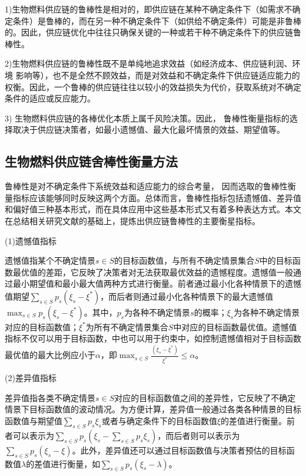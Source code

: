 1)生物燃料供应链的鲁棒性是相对的，即供应链在某种不确定条件下（如需求不确定条件）是鲁棒的，而在另一种不确定条件下（如供给不确定条件）可能是非鲁棒的。因此，供应链优化中往往只确保关键的一种或若干种不确定条件下的供应链鲁棒性。

2)生物燃料供应链的鲁棒性既不是单纯地追求效益（如经济成本、供应链利润、环境 影响等），也不是全然不顾效益，而是对效益和不确定条件下供应链适应能力的权衡。因此，一个鲁棒的供应链往往以较小的效益损失为代价，获取系统对不确定条件的适应或反应能力。

3)	生物燃料供应链的各棒优化本质上属千风险决策。因此， 鲁棒性衡量指标的选择取决于供应链决策者，如最小遗憾值、最大化最坏情景的效益、期望值等。

\subsection{生物燃料供应链舍棒性衡量方法}
鲁棒性是对不确定条件下系统效益和适应能力的综合考量， 因而选取的鲁棒性衡量指标应该能够同时反映这两个方面。总体而言，鲁棒性指标包括遗憾值、差异值和偏好值三种基本形式，而在具体应用中这些基本形式又有着多种表达方式。本文在总结相关研究文献的基础上，提炼出供应链鲁棒性的主要衡星指标。

(1)遗憾值指标

遗憾值指某个不确定情景$s\in S$的目标函数值，与所有不确定情景集合$S$中的目标函数最优值的差距，它反映了决策者对无法获取最优效益的遗憾程度。遗憾值一般通过最小期望值和最小最大值两种方式进行衡量。前者通过最小化各种情景下的遗憾值期望$\displaystyle{\sum_{s\in S}p_s(\xi_s-\xi^*)}$，而后者则通过最小化各种情景下的最大遗憾值$\displaystyle{\max_{s\in S}p_s(\xi_s-\xi^*)}$\cite{tian2012}。其中，$p_s$为各种不确定情景$s$的概率；$\xi_s$为各种不确定情景对应的目标函数值；$\xi^*$为所有不确定情景集合$S$中对应的目标函数最优值。遗憾值指标不仅可以用于目标函数，中也可以用于约束中，如控制遗憾值相对于目标函数最优值的最大比例应小于$\alpha$，即$\displaystyle{\max_{s\in S}\frac{(\xi_s-\xi^*)}{\xi^*}\leqslant\alpha}$\cite{tian2012}。

(2)差异值指标

差异值指各类不确定情景$s\in S$对应的目标函数值之间的差异性，它反映了不确定情景下目标函数值的波动情况。为方便计算，差异值一般通过各类各种情景的目标函数值与期望值$\displaystyle{\sum_{s\in S}p_s\xi_s}$或者与确定条件下的目标函数值$\xi$的差值进行衡量。前者可以表示为$\displaystyle{\sum_{s\in S}p_s(\xi_s-\sum_{s\in S}p_s\xi_s)}$，而后者则可以表示为$\displaystyle{\sum_{s\in S}p_s(\xi_s-\xi)}$。此外，差异值还可以通过目标函数值与决策者预估的目标函数值$\lambda$的差值进行衡量，如$\displaystyle{\sum_{s\in S}p_s(\xi_s-\lambda)}$。

